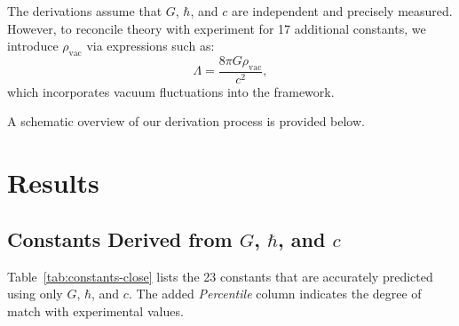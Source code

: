 \documentclass[12pt]{article}
\begin{document}
The derivations assume that \(G\), \(\hbar\), and \(c\) are independent and precisely measured. However, to reconcile theory with experiment for 17 additional constants, we introduce \(\rho_{\text{vac}}\) via expressions such as:
\[
\Lambda = \frac{8 \pi G \rho_{\text{vac}}}{c^2},
\]
which incorporates vacuum fluctuations into the framework.

A schematic overview of our derivation process is provided below.

\begin{center}
\end{center}

\section{Results}
\subsection{Constants Derived from \(G\), \(\hbar\), and \(c\)}
Table~\ref{tab:constants-close} lists the 23 constants that are accurately predicted using only \(G\), \(\hbar\), and \(c\). The added \emph{Percentile} column indicates the degree of match with experimental values.
\end{document}
